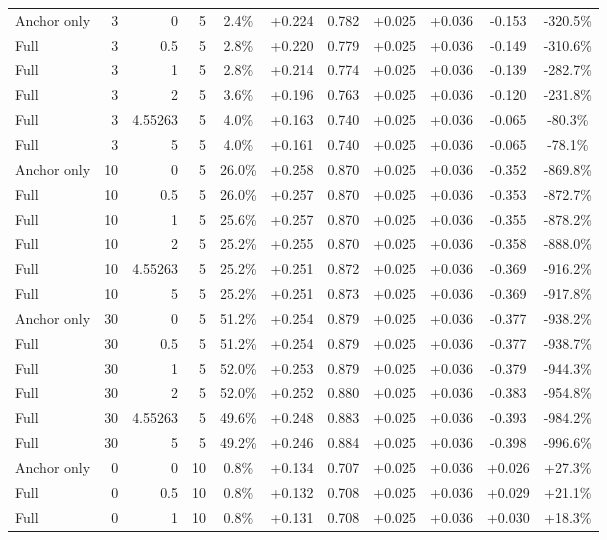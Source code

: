 \begin{table}[htbp]
\begin{tabular}{lrrrccccccc}
Anchor only & 3 & 0 & 5 & 2.4\% & +0.224 & 0.782 & +0.025 & +0.036 & -0.153 & -320.5\% \\
Full & 3 & 0.5 & 5 & 2.8\% & +0.220 & 0.779 & +0.025 & +0.036 & -0.149 & -310.6\% \\
Full & 3 & 1 & 5 & 2.8\% & +0.214 & 0.774 & +0.025 & +0.036 & -0.139 & -282.7\% \\
Full & 3 & 2 & 5 & 3.6\% & +0.196 & 0.763 & +0.025 & +0.036 & -0.120 & -231.8\% \\
Full & 3 & 4.55263 & 5 & 4.0\% & +0.163 & 0.740 & +0.025 & +0.036 & -0.065 & -80.3\% \\
Full & 3 & 5 & 5 & 4.0\% & +0.161 & 0.740 & +0.025 & +0.036 & -0.065 & -78.1\% \\
Anchor only & 10 & 0 & 5 & 26.0\% & +0.258 & 0.870 & +0.025 & +0.036 & -0.352 & -869.8\% \\
Full & 10 & 0.5 & 5 & 26.0\% & +0.257 & 0.870 & +0.025 & +0.036 & -0.353 & -872.7\% \\
Full & 10 & 1 & 5 & 25.6\% & +0.257 & 0.870 & +0.025 & +0.036 & -0.355 & -878.2\% \\
Full & 10 & 2 & 5 & 25.2\% & +0.255 & 0.870 & +0.025 & +0.036 & -0.358 & -888.0\% \\
Full & 10 & 4.55263 & 5 & 25.2\% & +0.251 & 0.872 & +0.025 & +0.036 & -0.369 & -916.2\% \\
Full & 10 & 5 & 5 & 25.2\% & +0.251 & 0.873 & +0.025 & +0.036 & -0.369 & -917.8\% \\
Anchor only & 30 & 0 & 5 & 51.2\% & +0.254 & 0.879 & +0.025 & +0.036 & -0.377 & -938.2\% \\
Full & 30 & 0.5 & 5 & 51.2\% & +0.254 & 0.879 & +0.025 & +0.036 & -0.377 & -938.7\% \\
Full & 30 & 1 & 5 & 52.0\% & +0.253 & 0.879 & +0.025 & +0.036 & -0.379 & -944.3\% \\
Full & 30 & 2 & 5 & 52.0\% & +0.252 & 0.880 & +0.025 & +0.036 & -0.383 & -954.8\% \\
Full & 30 & 4.55263 & 5 & 49.6\% & +0.248 & 0.883 & +0.025 & +0.036 & -0.393 & -984.2\% \\
Full & 30 & 5 & 5 & 49.2\% & +0.246 & 0.884 & +0.025 & +0.036 & -0.398 & -996.6\% \\
Anchor only & 0 & 0 & 10 & 0.8\% & +0.134 & 0.707 & +0.025 & +0.036 & +0.026 & +27.3\% \\
Full & 0 & 0.5 & 10 & 0.8\% & +0.132 & 0.708 & +0.025 & +0.036 & +0.029 & +21.1\% \\
Full & 0 & 1 & 10 & 0.8\% & +0.131 & 0.708 & +0.025 & +0.036 & +0.030 & +18.3\% \\

\end{tabular}
\end{table}
